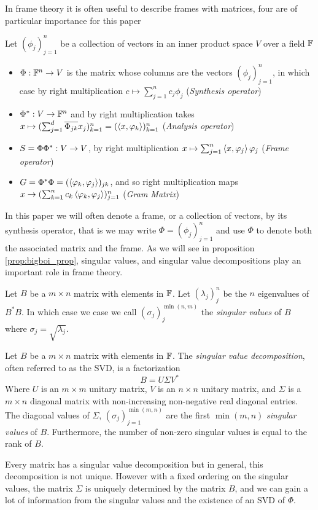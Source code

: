 In frame theory it is often useful to describe frames with matrices, four are of particular importance for this paper
\begin{Definition}
\label{def:frame_matrices}
    Let $(\phi_j)_{j=1}^n$ be a collection of vectors in an inner product space $V$ over a field $\mathbb{F}$
    \begin{itemize}
        \item $\Phi:\mathbb{F}^n\rightarrow V$ is the matrix whose columns are the vectors $(\phi_j)_{j=1}^n$, in which case by right multiplication $c\mapsto \sum_{j=1}^nc_j\phi_j$ (\textit{Synthesis operator})
        \item $\Phi^*:V\rightarrow \mathbb{F}^n$ and by right multiplication takes $x\mapsto (\sum_{j=1}^d\overline{\Phi_{jk}}x_j)_{k=1}^n=(\left\langle x,\varphi_k \right\rangle)_{k=1}^n$ (\textit{Analysis operator})
        \item $S=\Phi\Phi^*:V\rightarrow V$, by right multiplication $x\mapsto \sum_{j=1}^n{\left\langle x,\varphi_j \right\rangle\varphi_j}$ (\textit{Frame operator})
        \item $G=\Phi^*\Phi=(\left\langle \varphi_{k},\varphi_j \right\rangle)_{jk}$, and so right multiplication maps $x\rightarrow (\sum_{k=1}^n c_k \left\langle \varphi_k,\varphi_j \right\rangle)_{j=1}^n$ (\textit{Gram Matrix})
    \end{itemize}
\end{Definition}

In this paper we will often denote a frame, or a collection of vectors, by its synthesis operator, that is we may write $\Phi=(\phi_j)_{j=1}^n$ and use $\Phi$ to denote both the associated matrix and the frame.
As we will see in proposition \ref{prop:bigboi_prop}, singular values, and singular value decompositions play an important role in frame theory.

\begin{Definition}
\label{def:sing_vals}
    Let $B$ be a $m\times n$ matrix with elements in $\mathbb{F}$. Let $(\lambda_j)_j^{n}$ be the $n$ eigenvalues of $B^*B$. In which case we case we call $(\sigma_j)_j^{\min(n,m)}$ the \textit{singular values} of $B$ where $\sigma_j=\sqrt{\lambda_j}$.
\end{Definition}

\begin{Definition}
\label{def:SVD}
    Let $B$ be a $m\times n$ matrix with elements in $\mathbb{F}$. The \textit{singular value decomposition}, often referred to as the SVD, is a factorization
$$B=U\Sigma V^*$$
Where $U$ is an $m\times m$ unitary matrix, $V$ is an $n\times n$ unitary matrix, and $\Sigma$ is a $m\times n$ diagonal matrix with non-increasing non-negative real diagonal entries. The diagonal values of $\Sigma$, $(\sigma_j)_{j=1}^{\min(m,n)}$ are the first $\min(m,n)$ \textit{singular values} of $B$. Furthermore, the number of non-zero singular values is equal to the rank of $B$.
\end{Definition}
Every matrix has a singular value decomposition but in general, this decomposition is not unique. However with a fixed ordering on the singular values, the matrix $\Sigma$ is uniquely determined by the matrix $B$, and we can gain a lot of information from the singular values and the existence of an SVD of $\Phi$.

